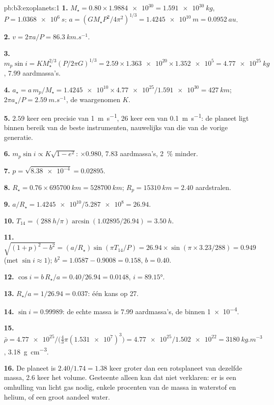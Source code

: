 \begin{solution}{pb:b3:exoplanets:1}
\textbf{1.} $M_\star = 0.80\times\num{1.9884e30} = \qty{1.591e30}{kg}$, $P =
\qty{1.0368e6}{s}$: $a = (GM_\star P^2/4\pi^2)^{1/3} = \qty{1.4245e10}{m}
= \qty{0.0952}{au}$.

\textbf{2.} $v = 2\pi a/P = \qty{86.3}{km.s^{-1}}$.

\textbf{3.} $m_p\sin i = KM_\star^{2/3}(P/2\pi G)^{1/3} = 2.59\times\num{1.363e20}
\times\num{1.352e5} = \qty{4.77e25}{kg}$, \num{7.99} aardmassa's.

\textbf{4.} $a_\star = a\,m_p/M_\star = \num{1.4245e10}\times\num{4.77e25}/
\num{1.591e30} = \qty{427}{km}$; $2\pi a_\star/P = \qty{2.59}{m.s^{-1}}$,
de waargenomen $K$.

\textbf{5.} $2.59$ keer een precisie van \qty{1}{m.s^{-1}}, 26 keer een van
\qty{0.1}{m.s^{-1}}: de planeet ligt binnen bereik van de beste instrumenten,
nauwelijks van die van de vorige generatie.

\textbf{6.} $m_p\sin i \propto K\sqrt{1 - e^2}$: $\times0.980$, 7.83 aardmassa's,
\qty{2}{\percent} minder.

\textbf{7.} $p = \sqrt{\num{8.38e-4}} = 0.02895$.

\textbf{8.} $R_\star = 0.76\times\qty{695700}{km} = \qty{528700}{km}$; $R_p =
\qty{15310}{km} = 2.40$ aardstralen.

\textbf{9.} $a/R_\star = \num{1.4245e10}/\num{5.287e8} = 26.94$.

\textbf{10.} $T_{14} = (\qty{288}{h}/\pi)\arcsin(1.02895/26.94) = \qty{3.50}{h}$.

\textbf{11.} $\sqrt{(1 + p)^2 - b^2} = (a/R_\star)\sin(\pi T_{14}/P) = 26.94\times
\sin(\pi\times3.23/288) = 0.949$ (met $\sin i \approx 1$); $b^2 =
1.0587 - 0.9008 = 0.158$, $b = 0.40$.

\textbf{12.} $\cos i = b\,R_\star/a = 0.40/26.94 = 0.0148$, $i = \ang{89.15}$.

\textbf{13.} $R_\star/a = 1/26.94 = 0.037$: één kans op 27.

\textbf{14.} $\sin i = 0.99989$: de echte massa is 7.99 aardmassa's, de  binnen \num{1e-4}.

\textbf{15.} $\bar\rho = \num{4.77e25}/\bigl(\tfrac43\pi(\num{1.531e7})^3\bigr) =
\num{4.77e25}/\num{1.502e22} = \qty{3180}{kg.m^{-3}}$,
\qty{3.18}{g.cm^{-3}}.

\textbf{16.} De planeet is $2.40/1.74 = 1.38$ keer groter dan een rotsplaneet van
dezelfde massa, 2.6 keer het volume. Gesteente alleen kan dat niet verklaren: er is
een omhulling van licht gas nodig, enkele procenten van de massa in waterstof en
helium, of een groot aandeel water.


\end{solution}
